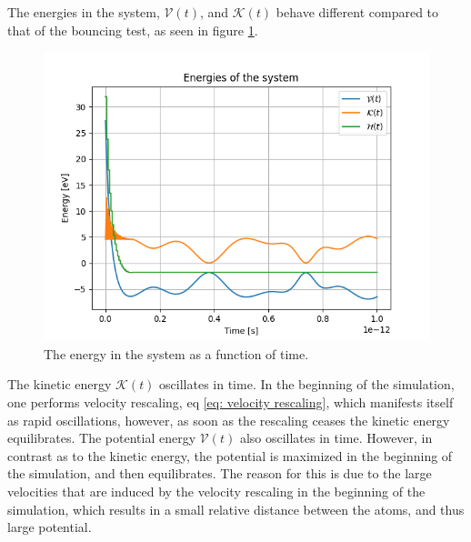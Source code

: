\documentclass[a4paper]{article}
\newcommand{\newparagraph}{\vspace{.5cm}\noindent}
\begin{document}
\newparagraph
The energies in the system, $\mathcal{V}(t)$, and $\mathcal{K}(t)$ behave different compared to that of the bouncing test, as seen in figure \ref{fig: Energy gas}.
\begin{figure}[H]
    \centering
    \includegraphics[scale = 0.5]{energy_gas.png}
    \caption{The energy in the system as a function of time.}
    \label{fig: Energy gas}
\end{figure}\noindent
The kinetic energy $\mathcal{K}(t)$ oscillates in time. In the beginning of the simulation, one performs velocity rescaling, eq \eqref{eq: velocity rescaling}, which manifests itself as rapid oscillations, however, as soon as the rescaling ceases the kinetic energy equilibrates.
The potential energy $\mathcal{V}(t)$ also oscillates in time. However, in contrast as to the kinetic energy, the potential is maximized in the beginning of the simulation, and then equilibrates.
The reason for this is due to the large velocities that are induced by the velocity rescaling in the beginning of the simulation, which results in a small relative distance between the atoms, and thus large potential.
\end{document}
